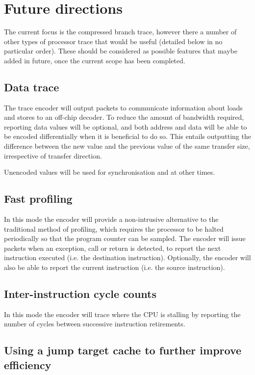 \chapter{Future directions} \label{Future}

The current focus is the compressed branch trace, however there a
number of other types of processor trace that would be useful 
(detailed below in no particular order). These
should be considered as possible features that maybe added in future,
once the current scope has been completed.

\section{Data trace}

The trace encoder will output packets to communicate information
about loads and stores to an off-chip decoder.  To reduce the amount
of bandwidth required, reporting data values will be optional, and
both address and data will be able to be encoded differentially when
it is beneficial to do so.  This entails outputting the difference
between the new value and the previous value of the same transfer
size, irrespective of transfer direction.

Unencoded values will be used for synchronisation and at other times.

\section{Fast profiling}

In this mode the encoder will provide a non-intrusive alternative to
the traditional method of profiling, which requires the processor to
be halted periodically so that the program counter can be sampled.
The encoder will issue packets when an exception, call or return is
detected, to report the next instruction executed (i.e. the
destination instruction).  Optionally, the encoder will also be able to
report the current instruction (i.e. the source instruction).

\section{Inter-instruction cycle counts}

In this mode the encoder will trace where the CPU is stalling by
reporting the number of cycles between successive instruction
retirements.

\section{Using a jump target cache to further improve efficiency}

